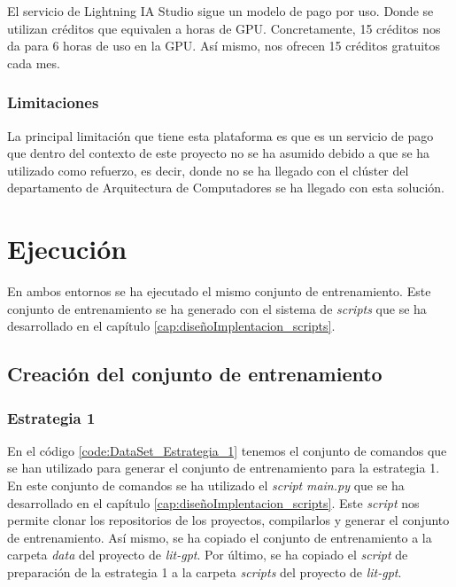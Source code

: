 El servicio de Lightning IA Studio sigue un modelo de pago por uso. Donde se utilizan
créditos que equivalen a horas de GPU. Concretamente, 15 créditos nos da para 6 horas de
uso en la GPU. Así mismo, nos ofrecen 15 créditos gratuitos cada mes. \cite{lightningiaPricing}

\subsubsection{Limitaciones}
\label{subsubsec:limitaciones}


La principal limitación que tiene esta plataforma es que es un servicio de pago que dentro
del contexto de este proyecto no se ha asumido debido a que se ha utilizado como refuerzo, es
decir, donde no se ha llegado con el clúster del departamento de Arquitectura de Computadores
se ha llegado con esta solución.

\section{Ejecución}
\label{sec:ejecucion}

En ambos entornos se ha ejecutado el mismo conjunto de entrenamiento. Este conjunto de
entrenamiento se ha generado con el sistema de \textit{scripts} que se ha desarrollado en el capítulo
\ref{cap:diseñoImplentacion_scripts}.

\subsection{Creación del conjunto de entrenamiento}
\label{subsec:creacion_conjunto_entrenamiento}

\subsubsection{Estrategia 1}
\label{subsubsec:creacion_conjunto:estrategia_1}


En el código \ref{code:DataSet_Estrategia_1} tenemos el conjunto de comandos que se han
utilizado para generar el conjunto de entrenamiento para la estrategia 1. En este conjunto
de comandos se ha utilizado el \textit{script} \textit{main.py} que se ha desarrollado en el capítulo
\ref{cap:diseñoImplentacion_scripts}. Este \textit{script} nos permite clonar los repositorios de
los proyectos, compilarlos y generar el conjunto de entrenamiento. Así mismo, se ha copiado
el conjunto de entrenamiento a la carpeta \textit{data} del proyecto de \textit{lit-gpt}.
Por último, se ha copiado el \textit{script} de preparación de la estrategia 1 a la carpeta \textit{scripts}
del proyecto de \textit{lit-gpt}.

